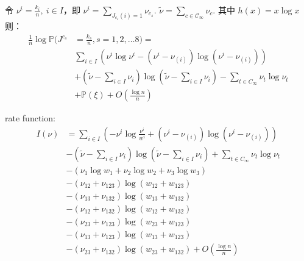 \documentclass[cn,hazy,egreen,14pt,normal]{elegantnote}
\begin{document}

令 $\nu^{i} = \frac{k_i}{n}, ~i\in I$，即 $\nu^{i} = \sum_{J_{c_s}(i)=1} \nu_{c_s}$.
$\tilde{\nu} = \sum_{c \in \mathcal{C}_{\infty}} \nu_{c}$.
其中 $h(x) = x \log x$
则：  
\begin{align*}
    \frac{1}{n} \log \mathbb{P} (J^{c_s} &= \frac{k_s}{n}, s = 1, 2, \dots 8) = \\
    &\sum_{i \in I} \left(\nu^{i} \log \nu^{i} - (\nu^{i} - \nu_{(i)}) \log(\nu^{i} - \nu_{(i)})\right) \\
    &+(\tilde{\nu} - \sum_{i \in I} \nu_{i}) \log (\tilde{\nu} - \sum_{i \in I} \nu_{i})
    -\sum_{t \in C_{\infty}} \nu_t \log \nu_t \\
    &+ \mathbb{P}(\xi)  + O(\frac{\log n}{n}) 
\end{align*}

rate function:
\begin{align*}
    I(\nu) 
    &= \sum_{i \in I} \left(-\nu^{i} \log \frac{\nu^{i}}{w^{i}} + (\nu^{i} - \nu_{(i)}) \log(\nu^{i} - \nu_{(i)})\right) \\
    &-(\tilde{\nu} - \sum_{i \in I} \nu_i) \log (\tilde{\nu} - \sum_{i \in I} \nu_i)
    +\sum_{t \in C_{\infty}} \nu_t \log \nu_t \\
    &- (\nu_{1} \log w_{1} + \nu_{2} \log w_{2} + \nu_{3} \log w_{3})\\
    &- (\nu_{12} + \nu_{123}) \log(w_{12} + w_{123}) \\
    &- (\nu_{13} + \nu_{132}) \log(w_{13} + w_{132}) \\
    &- (\nu_{12} + \nu_{132}) \log(w_{12} + w_{132}) \\
    &- (\nu_{23} + \nu_{123}) \log(w_{23} + w_{123}) \\
    &- (\nu_{13} + \nu_{123}) \log(w_{13} + w_{123}) \\
    &- (\nu_{23} + \nu_{132}) \log(w_{23} + w_{132}) 
    + O(\frac{\log n}{n}) 
\end{align*}
\end{document}

